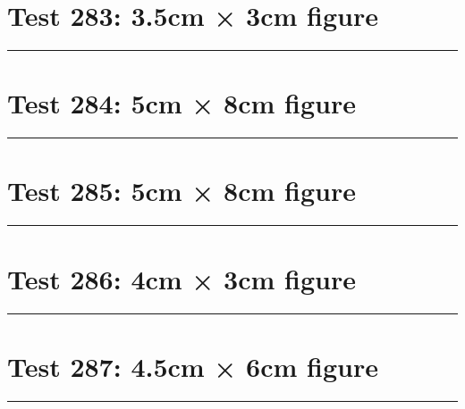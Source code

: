 \documentclass[a4paper,11pt]{article}
\begin{document}
\section*{Test 283: 3.5cm × 3cm figure}
\begin{swarmwrap}%
  \begin{minipage}[t]{3cm}
    \centering
    \rule{\linewidth}{3cm}
  \end{minipage}%
\end{swarmwrap}%
\swarmwrapnext
\lipsum[59]
\lipsum[60]
\lipsum[61]
\lipsum[62]
\section*{Test 284: 5cm × 8cm figure}
\begin{swarmwrap}%
  \begin{minipage}[t]{5cm}
    \centering
    \rule{\linewidth}{8cm}
  \end{minipage}%
\end{swarmwrap}%
\swarmwrapnext
\lipsum[25]
\lipsum[26]
\lipsum[27]
\lipsum[28]
\lipsum[29]
\section*{Test 285: 5cm × 8cm figure}
\begin{swarmwrap}%
  \begin{minipage}[t]{5cm}
    \centering
    \rule{\linewidth}{8cm}
  \end{minipage}%
\end{swarmwrap}%
\swarmwrapnext
\lipsum[69]
\lipsum[70]
\lipsum[71]
\section*{Test 286: 4cm × 3cm figure}
\begin{swarmwrap}%
  \begin{minipage}[t]{4cm}
    \centering
    \rule{\linewidth}{3cm}
  \end{minipage}%
\end{swarmwrap}%
\swarmwrapnext
\lipsum[96]
\lipsum[97]
\lipsum[98]
\lipsum[99]
\lipsum[100]
\lipsum[101]
\section*{Test 287: 4.5cm × 6cm figure}
\begin{swarmwrap}%
  \begin{minipage}[t]{4cm}
    \centering
    \rule{\linewidth}{6cm}
  \end{minipage}%
\end{swarmwrap}%
\swarmwrapnext
\lipsum[97]
\lipsum[98]
\lipsum[99]
\lipsum[100]
\lipsum[101]
\lipsum[102]
\end{document}
